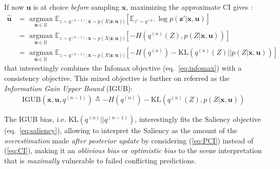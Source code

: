 \documentclass[12pt,twoside,openright]{article}
\begin{document}
{\color{Purple}If now $\boldsymbol{u}$ is at choice \emph{before} sampling  $\boldsymbol{x}$, maximizing the approximate CI} gives :
\begin{align}
	\hat{\boldsymbol{u}} 
	&= \underset{\boldsymbol{u} \in \mathcal{U}}{\text{ argmax }} \mathbb{E}_{z\sim q^{(n-1)}; \boldsymbol{x}\sim p(X|\boldsymbol{z},\boldsymbol{u}))} 
	\left[\mathbb{E}_{z'\sim q^{(n)} }\log p(\boldsymbol{z}'|\boldsymbol{x}, \boldsymbol{u})\right]\nonumber\\
	&= \underset{\boldsymbol{u} \in \mathcal{U}}{\text{ argmax }} \mathbb{E}_{z\sim q^{(n-1)}; \boldsymbol{x}\sim p(X|\boldsymbol{z},\boldsymbol{u}))} \left[-H(q^{(n)}(Z), p(Z|\boldsymbol{x}, \boldsymbol{u}))\right]\\
	&= \underset{\boldsymbol{u} \in \mathcal{U}}{\text{ argmax }} \mathbb{E}_{z\sim q^{(n-1)}; \boldsymbol{x}\sim p(X|\boldsymbol{z},\boldsymbol{u}))} \left[-H(q^{(n)}) - \text{KL}(q^{(n)}(Z)|| p(Z|\boldsymbol{x}, \boldsymbol{u}))\right]\label{eq:PC-pred}
\end{align}
that {\color{Purple} interestingly} combines the Infomax objective (eq.~\ref{eq:infomax}) with a consistency objective. This mixed objective is further on referred as the \emph{Information Gain Upper Bound} (IGUB):
\begin{align}\text{IGUB}(\boldsymbol{x}, \boldsymbol{u}, q^{(n-1)})\triangleq -H(q^{(n)}) - \text{KL}(q^{(n)}(Z), p(Z|\boldsymbol{x}, \boldsymbol{u}))\label{eq:PC}
\end{align}



{\color{Purple}The IGUB bias, i.e. $\text{KL} (q^{(n)}||q^{(n-1)})$, interestingly} fits the Saliency objective (eq.~\ref{eq:saliency}), allowing to interpret the Saliency as the amount of the \emph{overestimation} made \emph{after posterior update} by considering (\ref{eq:PCI}) instead of (\ref{eq:CI}), making it an \emph{oblivious bias} or \emph{optimistic bias} to the scene interpretation that is \emph{maximally} vulnerable to failed conflicting predictions.
\end{document}
